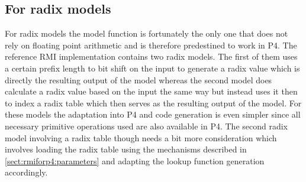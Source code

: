 \subsection{For radix models}
\label{sect:rmiforp4:radix}
For radix models the model function is fortunately the only one that does not rely on floating point arithmetic and is therefore predestined to work in P4. The reference RMI implementation contains two radix models. The first of them uses a certain prefix length to bit shift on the input to generate a radix value which is directly the resulting output of the model whereas the second model does calculate a radix value based on the input the same way but instead uses it then to index a radix table which then serves as the resulting output of the model. For these models the adaptation into P4 and code generation is even simpler since all necessary primitive operations used are also available in P4. The second radix model involving a radix table though needs a bit more consideration which involves loading the radix table using the mechanisms described in \ref{sect:rmiforp4:parameters} and adapting the lookup function generation accordingly.

